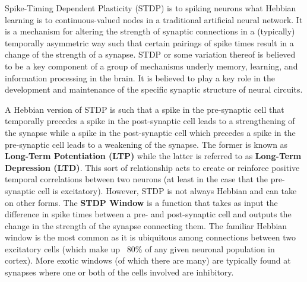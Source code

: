 Spike-Timing Dependent Plasticity (STDP) is to spiking neurons what Hebbian learning is to continuous-valued nodes in a traditional artificial neural network. It is a mechanism for altering the strength of synaptic connections in a (typically) temporally asymmetric way such that certain pairings of spike times result in a change of the strength of a synapse. STDP or some variation thereof is believed to be a key component of a group of mechanisms underly memory, learning, and information processing in the brain. It is believed to play a key role in the development and maintenance of the specific synaptic structure of neural circuits.

 A Hebbian version of STDP is such that a spike in the pre-synaptic cell that temporally precedes a spike in the post-synaptic cell leads to a strengthening of the synapse while a spike in the post-synaptic cell which precedes a spike in the pre-synaptic cell leads to a weakening of the synapse. The former is known as \textbf{Long-Term Potentiation (LTP)} while the latter is referred to as \textbf{Long-Term Depression (LTD)}. This sort of relationship acts to create or reinforce positive temporal correlations between two neurons (at least in the case that the pre-synaptic cell is excitatory). However, STDP is not always Hebbian and can take on other forms. The  \textbf{STDP Window} is a function that takes as input the difference in spike times between a pre- and post-synaptic cell and outputs the change in the strength of the synapse connecting them. The familiar Hebbian window is the most common as it is ubiquitous among connections between two excitatory cells (which make up ~80\% of any given neuronal population in cortex). More exotic windows (of which there are many) are typically found at synapses where one or both of the cells involved are inhibitory. %
 
